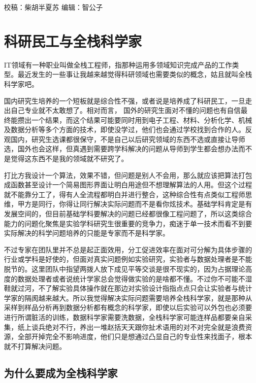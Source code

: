 \documentclass[]{book}
\begin{document}
校稿：柴胡半夏苏
编辑：智公子

\hypertarget{ux79d1ux7814ux6c11ux5de5ux4e0eux5168ux6808ux79d1ux5b66ux5bb6}{%
\section{科研民工与全栈科学家}\label{ux79d1ux7814ux6c11ux5de5ux4e0eux5168ux6808ux79d1ux5b66ux5bb6}}

IT领域有一种职业叫做全栈工程师，指那种运用多领域知识完成产品的工作类型。最近发生的一些事让我越来越觉得科研领域也需要类似的概念，姑且就叫全栈科学家吧。

国内研究生培养的一个短板就是综合性不强，或者说是培养成了科研民工，一旦走出自己专业就不太敢想了。相对而言， 国外的研究生面对不懂的问题也有自信最终能攒出一个结果，而这个结果可能要同时用到电子工程、材料、分析化学、机械及数据分析等多个方面的技术，即使没学过，他们也会通过学校找到合作的人。反观国内，研究生选课都很保守，不是自己以后研究领域的东西不选或直接让导师选，国外也会这样，但真遇到需要跨学科解决的问题从导师到学生都会想办法而不是觉得这东西不是我的领域就不研究了。

打比方我设计一个算法，效果不错，但问题是别人不会用，那么就应该把算法打包成函数甚至设计一个简易图形界面让明白用途但不想理解算法的人用。但这个过程就不能靠分工了，得有人全流程都明白并进行整合，这种综合性有点类似工程师思维，甲方是同行，你得让同行解决实际问题而不是看你炫技术。基础学科肯定是有发展空间的，但目前基础学科要解决的问题已经都很像工程问题了，所以这类综合能力的问题化聚焦是实验学科研究生很重要的竞争力，痴迷于单一技术而看不到要实际解决的科学问题培养的只能是专家而不是科学家。

不过专家在团队里并不总是起正面效用，分工促进效率在面对可分解为具体步骤的行业或学科是好使的，但面对真实问题例如实验研究，实验者与数据处理者是不能脱节的。这里团队中指望两拨人放下成见平等交谈是很不现实的，因为占据理论高度的数据处理者或者说统计学家总会觉得做实验的是啥都不懂。不过你不可能不湿鞋就过河，不了解实验具体操作就在那边对实验设计指指点点只会让实验者与统计学家的隔阂越来越大。所以我觉得解决实际问题需要培养全栈科学家，就是那种从采样到样品分析再到数据分析都有概念的科学家，即使以后实验可以外包也必须要进行所谓脏活的训练，数据科学家需要洗数据，全栈科学家可能连样品都要亲自采集，纸上谈兵绝对不行，养出一堆赵括天天跟你扯术语用的对不对完全就是浪费资源，全部开掉完全不影响进度，他们只是想通过凸显自己的专业性来找面子，根本就不打算解决问题。

\hypertarget{ux4e3aux4ec0ux4e48ux8981ux6210ux4e3aux5168ux6808ux79d1ux5b66ux5bb6}{%
\subsection{为什么要成为全栈科学家}\label{ux4e3aux4ec0ux4e48ux8981ux6210ux4e3aux5168ux6808ux79d1ux5b66ux5bb6}}
\end{document}
